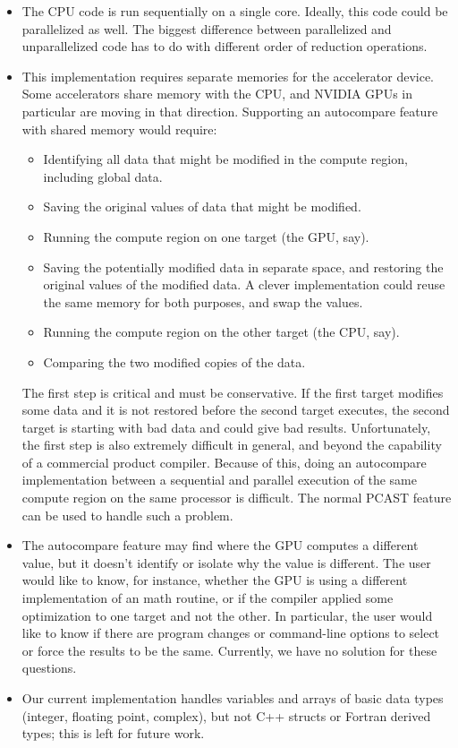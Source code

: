\begin{itemize}
\item The CPU code is run sequentially on a single core.
Ideally, this code could be parallelized as well.
The biggest difference between parallelized and unparallelized code has to do with different order of reduction operations.
\item This implementation requires separate memories for the accelerator device.
Some accelerators share memory with the CPU, and NVIDIA GPUs in particular are moving in that direction.
Supporting an autocompare feature with shared memory would require:
\begin{itemize}
\item Identifying all data that might be modified in the compute region, including global data.
\item Saving the original values of data that might be modified.
\item Running the compute region on one target (the GPU, say).
\item Saving the potentially modified data in separate space, and restoring the original values of the modified data.
A clever implementation could reuse the same memory for both purposes, and swap the values.
\item Running the compute region on the other target (the CPU, say).
\item Comparing the two modified copies of the data.
\end{itemize}
The first step is critical and must be conservative.
If the first target modifies some data and it is not restored before the second target executes, the second target is starting with bad data and could give bad results.
Unfortunately, the first step is also extremely difficult in general, and beyond the capability of a commercial product compiler.
Because of this, doing an autocompare implementation between a sequential and parallel execution of the same compute region on the same processor is difficult.
The normal PCAST feature can be used to handle such a problem.
\item The autocompare feature may find where the GPU computes a different value, but it doesn't identify or isolate why the value is different.
The user would like to know, for instance, whether the GPU is using a different implementation of an math routine, or if the compiler applied some optimization to one target and not the other.
In particular, the user would like to know if there are program changes or command-line options to select or force the results to be the same.
Currently, we have no solution for these questions.
\item Our current implementation handles variables and arrays of basic data types (integer, floating point, complex), but not C++ structs or Fortran derived types; this is left for future work.
\end{itemize}
